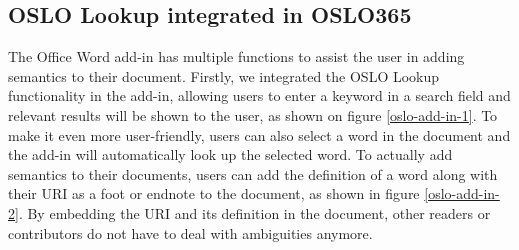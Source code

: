 \documentclass[manuscript]{acmart}
\begin{document}
\subsection{OSLO Lookup integrated in OSLO365}

The Office Word add-in has multiple functions to assist the user in adding semantics to their document. 
Firstly, we integrated the OSLO Lookup functionality in the add-in, allowing users to enter a keyword in a search field and relevant results will be shown to the user, as shown on figure \ref{oslo-add-in-1}. 
To make it even more user-friendly, users can also select a word in the document and the add-in will automatically look up the selected word. 
To actually add semantics to their documents, users can add the definition of a word along with their URI as a foot or endnote to the document, as shown in figure \ref{oslo-add-in-2}.
By embedding the URI and its definition in the document, other readers or contributors do not have to deal with ambiguities anymore.
\end{document}
